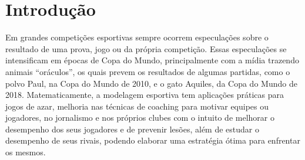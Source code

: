 \documentclass[11pt,letterpaper,twocolumn]{article}
\begin{document}

\section{Introdução}
\justify

Em grandes competições esportivas sempre ocorrem especulações sobre o resultado de uma prova, jogo ou da própria competição. Essas especulações se intensificam em épocas de Copa do Mundo, principalmente com a mídia trazendo animais ``oráculos'', os quais prevem os resultados de algumas partidas, como o polvo Paul, na Copa do Mundo de 2010, e o gato Aquiles, da Copa do Mundo de 2018. Matematicamente, a modelagem esportiva tem aplicações práticas para jogos de azar, melhoria nas técnicas de coaching para motivar equipes ou jogadores, no jornalismo e nos próprios clubes com o intuito de melhorar o desempenho dos seus jogadores e de prevenir lesões, além de estudar o desempenho de seus rivais, podendo elaborar uma estratégia ótima para enfrentar os mesmos.
\end{document}
